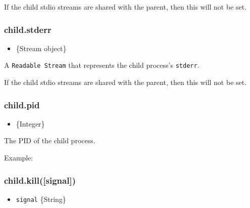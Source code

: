 If the child stdio streams are shared with the parent, then this will
not be set.

\subsubsection{child.stderr}

\begin{itemize}
\item
  \{Stream object\}
\end{itemize}

A \texttt{Readable Stream} that represents the child process's
\texttt{stderr}.

If the child stdio streams are shared with the parent, then this will
not be set.

\subsubsection{child.pid}

\begin{itemize}
\item
  \{Integer\}
\end{itemize}

The PID of the child process.

Example:

\begin{Shaded}
\begin{Highlighting}[]
 \NormalTok{,}
    \NormalTok{, [}\NormalTok{]);}

\NormalTok{(} \NormalTok{+ }\NormalTok{);}
\NormalTok{();}
\end{Highlighting}
\end{Shaded}

\subsubsection{child.kill({[}signal{]})}

\begin{itemize}
\item
  \texttt{signal} \{String\}
\end{itemize}

